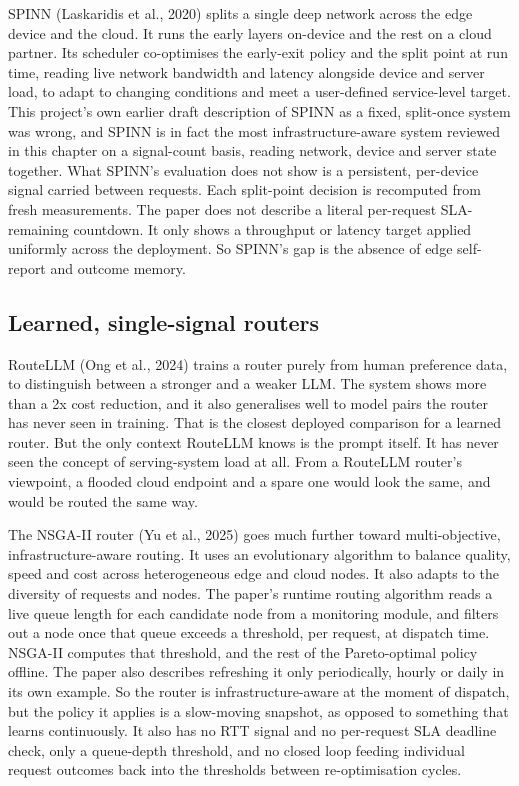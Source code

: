 SPINN (Laskaridis et al., 2020) splits a single deep network across the
edge device and the cloud. It runs the early layers on-device and the
rest on a cloud partner. Its scheduler co-optimises the early-exit
policy and the split point at run time, reading live network bandwidth
and latency alongside device and server load, to adapt to
changing conditions and meet a user-defined service-level target.
This project's own earlier draft description of SPINN as a fixed,
split-once system was wrong, and SPINN is in fact the most 
infrastructure-aware system reviewed in this chapter on a 
signal-count basis, reading network, device and server
state together. What SPINN's evaluation does not show 
is a persistent, per-device signal carried between requests.
Each split-point decision is recomputed from fresh measurements.
The paper does not describe a literal per-request SLA-remaining
countdown. It only shows a throughput or latency target applied uniformly across
the deployment. So SPINN's gap is the absence of edge self-report and outcome memory.

\hypertarget{learned-single-signal-routers}{%
\subsection{Learned, single-signal
routers}\label{learned-single-signal-routers}}

RouteLLM (Ong et al., 2024) trains a router purely from human
preference data, to distinguish between a stronger and a weaker LLM.
The system shows more than a 2x cost reduction, and it also generalises
well to model pairs the router has never seen in training. That is the 
closest deployed comparison for a learned router. 
But the only context RouteLLM knows is the prompt itself. It
has never seen the concept of serving-system load at all. From a
RouteLLM router's viewpoint, a flooded cloud endpoint and a spare one
would look the same, and would be routed the same way.

The NSGA-II router (Yu et al., 2025) goes much further toward
multi-objective, infrastructure-aware routing. It uses an evolutionary
algorithm to balance quality, speed and cost across heterogeneous edge
and cloud nodes. It also adapts to the diversity of requests and nodes.
The paper's runtime routing algorithm reads a live queue length
for each candidate node from a monitoring module, and filters
out a node once that queue exceeds a threshold, per request, at
dispatch time. NSGA-II computes that threshold, and the rest of the 
Pareto-optimal policy offline. The paper also describes refreshing it 
only periodically, hourly or daily in its own example. So the router 
is infrastructure-aware at the moment of dispatch,
but the policy it applies is a slow-moving snapshot,
as opposed to something that learns continuously. It also has no RTT signal and
no per-request SLA deadline check, only a queue-depth threshold, 
and no closed loop feeding individual request outcomes back into
the thresholds between re-optimisation cycles.

